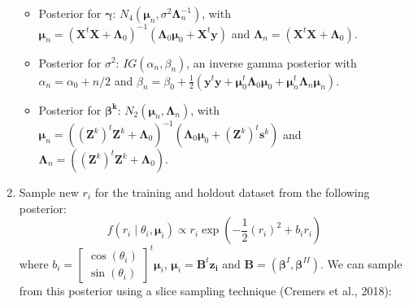 \documentclass[12pt,]{article}
\begin{document}
\begin{enumerate}
\begin{itemize}
\item Posterior for $\boldsymbol{\gamma}$: $N_4(\boldsymbol{\mu}_n, \sigma^2\boldsymbol{\Lambda}^{-1}_n)$, with $\boldsymbol{\mu}_n = (\boldsymbol{X}^t\boldsymbol{X} + \boldsymbol{\Lambda}_0)^{-1}(\boldsymbol{\Lambda}_0\boldsymbol{\mu}_0 + \boldsymbol{X}^t\boldsymbol{y})$ and $\boldsymbol{\Lambda}_n = (\boldsymbol{X}^t\boldsymbol{X} + \boldsymbol{\Lambda}_0)$.
\item Posterior for $\sigma^2$: $IG(\alpha_{n}, \beta_{n})$, an inverse gamma posterior with $\alpha_{n} = \alpha_0 + n/2$ and $\beta_{n} = \beta_0 + \frac{1}{2}(\boldsymbol{y}^t\boldsymbol{y} + \boldsymbol{\mu}_{0}^t\boldsymbol{\Lambda}_0\boldsymbol{\mu}_{0} + \boldsymbol{\mu}_{n}^t\boldsymbol{\Lambda}_n\boldsymbol{\mu}_{n})$.
\item Posterior for $\boldsymbol{\beta^{k}}$: $N_2(\boldsymbol{\mu}_n, \boldsymbol{\Lambda}_n)$, with $\boldsymbol{\mu}_n = ((\boldsymbol{Z}^k)^t\boldsymbol{Z}^k + \boldsymbol{\Lambda}_0)^{-1}(\boldsymbol{\Lambda}_0\boldsymbol{\mu}_0 + (\boldsymbol{Z}^k)^t\boldsymbol{s}^k)$ and $\boldsymbol{\Lambda}_n = ((\boldsymbol{Z}^k)^t\boldsymbol{Z}^k + \boldsymbol{\Lambda}_0)$.
\end{itemize}

\item Sample new $r_i$ for the training and holdout dataset from the following posterior:
$$f(r_i \mid \theta_i, \boldsymbol{\mu}_i) \propto r_i \exp{\left(-\frac{1}{2}(r_i)^2 + b_ir_i\right)}$$ 
where $b_i = \begin{bmatrix} \cos (\theta_i) \\ \sin (\theta_i)\end{bmatrix}^t\boldsymbol{\mu}_i$, $\boldsymbol{\mu}_i = \boldsymbol{B}^t\boldsymbol{z_i}$ and $\boldsymbol{B} = (\boldsymbol{\beta}^{I}, \boldsymbol{\beta}^{II})$. 
\noindent We can sample from this posterior using a slice sampling technique (Cremers et al., 2018): 


\end{enumerate}
\end{document}
